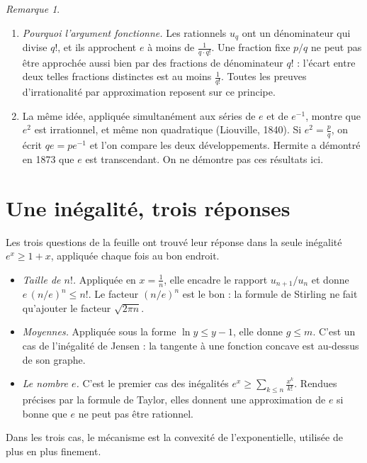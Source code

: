\documentclass[11pt,a4paper]{article}
\theoremstyle{plain}
\theoremstyle{definition}
\theoremstyle{remark}
\newtheorem{remarque}[theoreme]{Remarque}
\begin{document}
\begin{remarque}
\begin{enumerate}[nosep]
\item \emph{Pourquoi l'argument fonctionne.} Les rationnels $u_q$ ont un dénominateur qui divise $q!$, et ils approchent $e$ à moins de $\frac1{q\cdot q!}$. Une fraction fixe $p/q$ ne peut pas être approchée aussi bien par des fractions de dénominateur $q!$ : l'écart entre deux telles fractions distinctes est au moins $\frac1{q!}$. Toutes les preuves d'irrationalité par approximation reposent sur ce principe.
\item La même idée, appliquée simultanément aux séries de $e$ et de $e^{-1}$, montre que $e^2$ est irrationnel, et même non quadratique (Liouville, 1840). Si $e^2=\frac pq$, on écrit $qe=pe^{-1}$ et l'on compare les deux développements. Hermite a démontré en 1873 que $e$ est transcendant. On ne démontre pas ces résultats ici.
\end{enumerate}
\end{remarque}

\section{Une inégalité, trois réponses}

Les trois questions de la feuille ont trouvé leur réponse dans la seule inégalité $e^x\geq1+x$, appliquée chaque fois au bon endroit.
\begin{itemize}[nosep]
\item \emph{Taille de $n!$.} Appliquée en $x=\frac1n$, elle encadre le rapport $u_{n+1}/u_n$ et donne $e\,(n/e)^n\leq n!$. Le facteur $(n/e)^n$ est le bon : la formule de Stirling ne fait qu'ajouter le facteur $\sqrt{2\pi n}$.
\item \emph{Moyennes.} Appliquée sous la forme $\ln y\leq y-1$, elle donne $g\leq m$. C'est un cas de l'inégalité de Jensen : la tangente à une fonction concave est au-dessus de son graphe.
\item \emph{Le nombre $e$.} C'est le premier cas des inégalités $e^x\geq\sum_{k\leq n}\frac{x^k}{k!}$. Rendues précises par la formule de Taylor, elles donnent une approximation de $e$ si bonne que $e$ ne peut pas être rationnel.
\end{itemize}
Dans les trois cas, le mécanisme est la convexité de l'exponentielle, utilisée de plus en plus finement.
\end{document}
